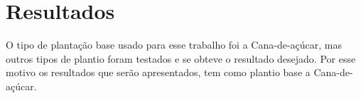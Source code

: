 \section{Resultados}

O tipo de plantação base usado para esse trabalho foi a Cana-de-açúcar, mas outros tipos de plantio foram testados e se obteve o resultado desejado. Por esse motivo os resultados que serão apresentados, tem como plantio base a Cana-de-açúcar.
